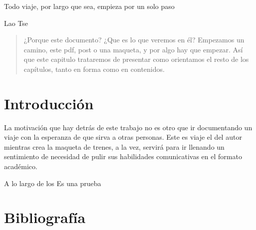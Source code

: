 
\epigraph{Todo viaje, por largo que sea, empieza por un solo paso}{Lao Tse}

\begin{abstract}
¿Porque este documento? ¿Que es lo que veremos en él? Empezamos un camino, este pdf, post o una maqueta, y por algo hay que empezar. Así que este capitulo trataremos de presentar como orientamos el resto de los capítulos, tanto en forma como en contenidos.
\end{abstract}

\section{Introducción}
La motivación que hay detrás de este trabajo no es otro que ir documentando un viaje con la esperanza de que sirva a otras personas. Este es viaje el del autor mientras crea la maqueta de trenes, a la vez, servirá para ir llenando un sentimiento de necesidad de pulir sus habilidades comunicativas en el formato académico.

A lo largo de los   
\cite{acemoglu2000} Es una prueba
\section{Bibliografía}
\printbibliography[heading=subbibliography]
